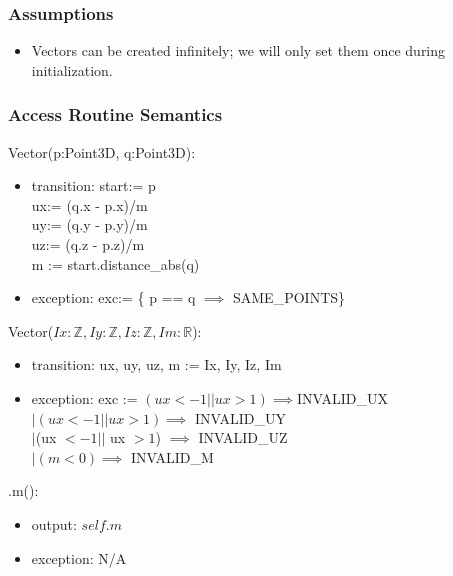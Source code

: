 \documentclass[12pt, titlepage]{article}
\begin{document}
\subsubsection{Assumptions}
\begin{itemize}
	\item Vectors can be created infinitely; we will only set them once during 
	initialization.			
\end{itemize}

\subsubsection{Access Routine Semantics}
\noindent Vector(p:Point3D, q:Point3D):
\begin{itemize}
	\item transition: start:= p\\
	ux:= (q.x - p.x)/m \\
	uy:= (q.y - p.y)/m \\
	uz:= (q.z - p.z)/m \\
	m := start.distance\_abs(q)\\
	\item exception: exc:= \{ p == q $\implies$ SAME\_POINTS\}
\end{itemize}


\noindent Vector($Ix: \mathbb{Z}, Iy: \mathbb{Z}, Iz: \mathbb{Z}, Im: 
\mathbb{R} 
$):
\begin{itemize}
	\item transition: ux, uy, uz, m := Ix, Iy, Iz, Im
	\item exception: exc := $(ux < -1 || ux > 1) \implies $INVALID\_UX \\
	$ | (ux < -1 || ux > 1) \implies$  INVALID\_UY \\ $| $(ux $< -1 ||$ ux $> 
	1$) $\implies $ INVALID\_UZ \\ $| (m < 0) \implies$ INVALID\_M 
\end{itemize}

\noindent .m():
\begin{itemize}
	\item output: $self.m$
	\item exception: N/A
\end{itemize}
\end{document}
